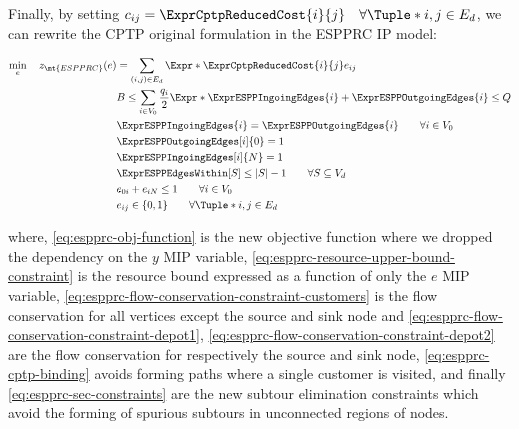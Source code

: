 Finally, by setting $c_{ij} = \ExprCptpReducedCost{i}{j} \quad \forall \Tuple*{i, j} \in E_d$, we can rewrite the CPTP original formulation in the ESPPRC IP model:

\begin{align}
	\min_{e} \quad z_\mt{ESPPRC}(e) & =  \sum_{(i, j) \in E_d} \Expr*{ \ExprCptpReducedCost{i}{j} } e_{ij} \label{eq:espprc-obj-function}                                                                                            \\
	                                & B \le \sum_{i \in V_0} \frac{q_i}{2} \Expr*{ \ExprESPPIngoingEdges{i} + \ExprESPPOutgoingEdges{i} }  \le Q                            \label{eq:espprc-resource-upper-bound-constraint}        \\
	                                & \ExprESPPIngoingEdges{i} = \ExprESPPOutgoingEdges{i}                                                \qquad \forall i \in V_0          \label{eq:espprc-flow-conservation-constraint-customers} \\
	                                & \ExprESPPOutgoingEdges[i]{0} = 1                                                                                                      \label{eq:espprc-flow-conservation-constraint-depot1}    \\
	                                & \ExprESPPIngoingEdges[i]{N} = 1                                                                                                       \label{eq:espprc-flow-conservation-constraint-depot2}    \\
	                                & \ExprESPPEdgesWithin[S] \le |S| - 1                                                                  \qquad \forall S \subseteq V_d   \label{eq:espprc-sec-constraints}                        \\
	                                & e_{0i} + e_{iN} \le 1                                                                                \qquad \forall i \in V_0         \label{eq:espprc-cptp-binding}                           \\
	                                & e_{ij}                   \in \lbrace 0, 1 \rbrace                                                    \qquad \forall \Tuple*{i, j} \in E_d    \label{eq:espprc-e-mip-var-bounds}                \\
\end{align}

where, \eqref{eq:espprc-obj-function} is the new objective function where we dropped the dependency on the $y$ MIP variable,
\eqref{eq:espprc-resource-upper-bound-constraint} is the resource bound expressed as a function of only the $e$ MIP variable,
\eqref{eq:espprc-flow-conservation-constraint-customers} is the flow conservation for all vertices except the source and sink node
and \eqref{eq:espprc-flow-conservation-constraint-depot1}, \eqref{eq:espprc-flow-conservation-constraint-depot2} are the flow conservation for respectively the source and sink node,
\eqref{eq:espprc-cptp-binding} avoids forming paths where a single customer is visited,
and finally \eqref{eq:espprc-sec-constraints} are the new subtour elimination constraints which avoid the forming of spurious subtours in unconnected regions of nodes.

